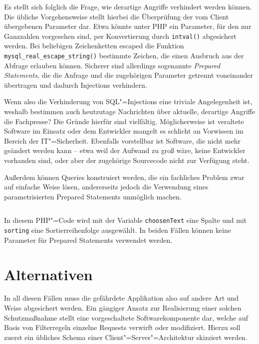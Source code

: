 Es stellt sich folglich die Frage, wie derartige Angriffe verhindert werden können. Die übliche Vorgehensweise stellt hierbei die Überprüfung der vom Client übergebenen Parameter dar. Etwa könnte unter PHP ein Parameter, für den nur Ganzzahlen vorgesehen sind, per Konvertierung durch \texttt{intval()} abgesichert werden.  Bei beliebigen Zeichenketten escaped die Funktion \texttt{mysql_real_escape_string()} bestimmte Zeichen, die einen Ausbruch aus der Abfrage erlauben können. Sicherer sind allerdings sogenannte \emph{Prepared Statements}, die die Anfrage und die zugehörigen Parameter getrennt voneinander übertragen und dadurch Injections verhindern.

Wenn also die Verhinderung von SQL"=Injections eine triviale Angelegenheit ist, weshalb bestimmen auch heutzutage Nachrichten über aktuelle, derartige Angriffe die Fachpresse? Die Gründe hierfür sind vielfältig. Möglicherweise ist veraltete Software im Einsatz oder dem Entwickler mangelt es schlicht an Vorwissen im Bereich der IT"=Sicherheit.
Ebenfalls vorstellbar ist Software, die nicht mehr geändert werden kann -- etwa weil der Aufwand zu groß wäre, keine Entwickler vorhanden sind, oder aber der zugehörige Sourcecode nicht zur Verfügung steht.

Außerdem können Queries konstruiert werden, die ein fachliches Problem zwar auf einfache Weise lösen, andererseits jedoch die Verwendung eines parametrisierten Prepared Statements unmöglich machen.

\begin{listing}
\begin{margincap}
\inputminted[startinline,obeytabs]{php}{imports/weak_features.php}
\caption{In diesem PHP"=Code wird mit der Variable \texttt{choosenText} eine Spalte und mit \texttt{sorting} eine Sortierreihenfolge ausgewählt. In beiden Fällen können keine Parameter für Prepared Statements verwendet werden.}
\label{lst:strange_query}
\end{margincap}
\end{listing}

\section{Alternativen}
In all diesen Fällen muss die gefährdete Applikation also auf andere Art und Weise abgesichert werden. Ein gängiger Ansatz zur Realisierung einer solchen Schutzmaßnahme stellt eine vorgeschaltete Softwarekomponente dar, welche auf Basis von Filterregeln einzelne Requests verwirft oder modifiziert. Hierzu soll zuerst ein übliches Schema einer Client"=Server"=Architektur skizziert werden.

